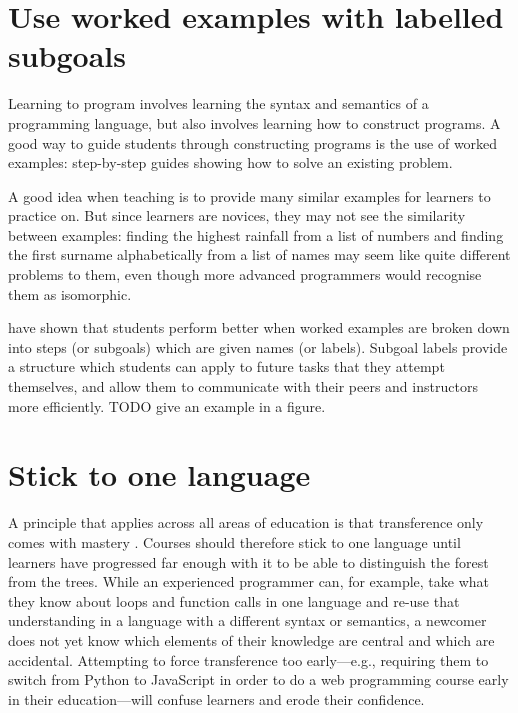 \documentclass{article}
\begin{document}
\section{Use worked examples with labelled subgoals}\label{worked-examples}

Learning to program involves learning the syntax and semantics of a programming language,
but also involves learning how to construct programs.
A good way to guide students through constructing programs is the use of worked examples:
step-by-step guides showing how to solve an existing problem.

A good idea when teaching is
to provide many similar examples for learners to practice on.
But since learners are novices,
they may not see the similarity between examples:
finding the highest rainfall from a list of numbers and
finding the first surname alphabetically from a list of names
may seem like quite different problems to them,
even though more advanced programmers would recognise them as isomorphic.

\citet{morrison-subgoals,morrison-parsons} have shown that students perform better
when worked examples are broken down into steps (or subgoals)
which are given names (or labels).
Subgoal labels provide a structure which students can apply to future tasks that they attempt themselves,
and allow them to communicate with their peers and instructors more efficiently.
TODO give an example in a figure.


\section{Stick to one language}\label{one-language}

A principle that applies across all areas of education is that
transference only comes with mastery \citep{gick-holyoak}.
Courses should therefore stick to one language until learners have progressed far enough with it
to be able to distinguish the forest from the trees.
While an experienced programmer can,
for example,
take what they know about loops and function calls in one language
and re-use that understanding in a language with a different syntax or semantics,
a newcomer does not yet know which elements of their knowledge are central
and which are accidental.
Attempting to force transference too early---e.g.,
requiring them to switch from Python to JavaScript in order to do a web programming course
early in their education---will confuse learners and erode their confidence.
\end{document}

